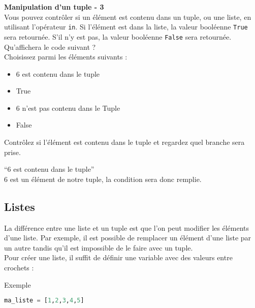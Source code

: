     \begin{Exercice}[5 minutes] \textbf{Manipulation d'un tuple - 3}\\
        Vous pouvez contrôler si un élément est contenu dans un tuple, ou une liste, en utilisant l'opérateur \lstinline{in}. Si l'élément est dans la liste, la valeur booléenne \lstinline{True} sera retournée. S'il n'y est pas, la valeur booléenne \lstinline{False} sera retournée. \\
        
        Qu'affichera le code suivant ? \\
        
        
        
        Choisissez parmi les éléments suivants : \\
        
        \begin{itemize}
        \item 6 est contenu dans le tuple
        \item True
        \item 6 n'est pas contenu dans le Tuple
        \item False \\
        \end{itemize}
    
        \begin{conseil}
            Contrôlez si l'élément est contenu dans le tuple et regardez quel branche sera prise.
        \end{conseil}
        
        \begin{solution}
           ``6 est contenu dans le tuple'' \\
           6 est un élément de notre tuple, la condition sera donc remplie.
        \end{solution}
    \end{Exercice}
    
    \subsection{Listes}
    La différence entre une liste et un tuple est que l'on peut modifier les éléments d'une liste. Par exemple, il est possible de remplacer un élément d'une liste par un autre tandis qu'il est impossible de le faire avec un tuple.
    \\
    Pour créer une liste, il suffit de définir une variable avec des valeurs entre crochets :
    \begin{Example}{\faTerminal \quad Exemple}
        \begin{lstlisting}[language=Python]
            ma_liste = [1,2,3,4,5]   \end{lstlisting}
    \end{Example}
    
